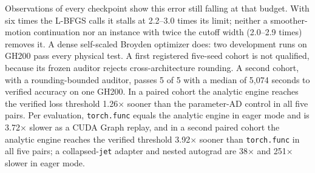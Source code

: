 \documentclass[11pt]{article}
\begin{document}
Observations of every checkpoint show this error still falling at that
budget. With six times the L-BFGS calls it stalls at 2.2--3.0 times its
limit; neither a smoother-motion continuation nor an instance with twice the
cutoff width (2.0--2.9 times) removes it. A dense self-scaled Broyden
optimizer does: two development runs on GH200 pass every physical test.
A first registered five-seed cohort is not qualified, because its frozen
auditor rejects cross-architecture rounding. A second cohort, with a
rounding-bounded auditor, passes 5 of 5 with a median of 5,074 seconds to
verified accuracy on one GH200. In a paired cohort the analytic engine
reaches the verified loss threshold 1.26$\times$ sooner than the
parameter-AD control in all five pairs. Per evaluation, \texttt{torch.func}
equals the analytic engine in eager mode and is 3.72$\times$ slower as a CUDA
Graph replay, and in a second paired cohort the analytic engine reaches the
verified threshold 3.92$\times$ sooner than \texttt{torch.func} in all five
pairs; a collapsed-\texttt{jet} adapter and nested autograd are 38$\times$
and 251$\times$ slower in eager mode.
\end{document}
